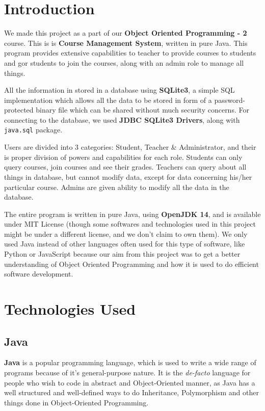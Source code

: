 \documentclass[12pt, a4paper]{article}
\begin{document}
\section*{Introduction}

We made this project as a part of our \textbf{Object Oriented Programming - 2} course. This is is \textbf{Course Management System}, written in pure Java. This program provides extensive capabilities to teacher to provide courses to students and gor students to join the courses, along with an admin role to manage all things.

All the information in stored in a database using \textbf{SQLite3}, a simple SQL implementation which allows all the data to be stored in form of a password-protected binary file which can be shared without much security concerns. For connecting to the database, we used \textbf{JDBC SQLite3 Drivers}, along with \lstinline{java.sql} package.

Users are divided into 3 categories: Student, Teacher \& Administrator, and their is proper division of powers and capabilities for each role. Students can only query courses, join courses and see their grades. Teachers can query about all things in database, but cannot modify data, except for data concerning his/her particular course. Admins are given ability to modify all the data in the database.


The entire program is written in pure Java, using \textbf{OpenJDK 14}, and is available under MIT License (though some softwares and technologies used in this project might be under a different license, and we don't claim to own them). We only used Java instead of other languages often used for this type of software, like Python or JavaScript because our aim from this project was to get a better understanding of Object Oriented Programming and how it is used to do efficient software development.

\newpage

\section{Technologies Used}

\subsection*{Java}

\textbf{Java} is a popular programming language, which is used to write a wide range of programs because of it's general-purpose nature. It is the \textit{de-facto} language for people who wish to code in abstract and Object-Oriented manner, as Java has a well structured and well-defined ways to do Inheritance, Polymorphism and other things done in Object-Oriented Programming.
\end{document}
